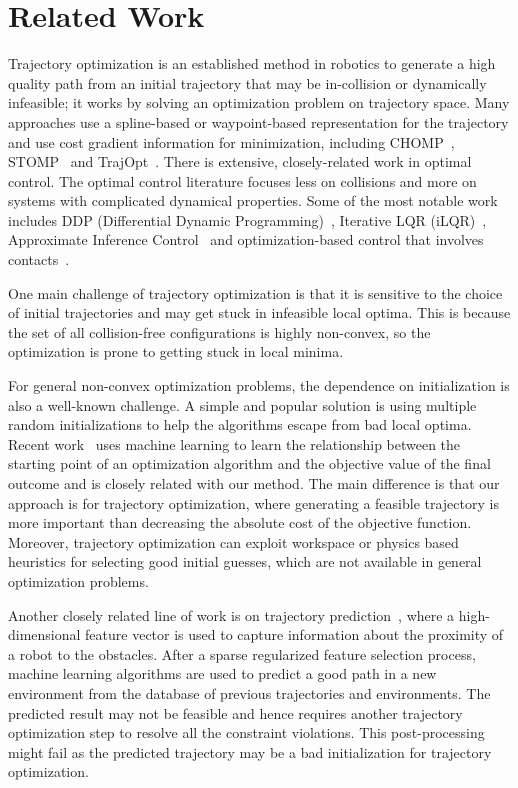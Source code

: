 \documentclass[letterpaper, 10 pt, conference]{ieeeconf}  %
\begin{document}
\section{Related Work}
\label{sec:related}
Trajectory optimization is an established method in robotics to generate a high quality path from an initial trajectory that may be in-collision or dynamically infeasible; it works by solving an optimization problem on trajectory space. Many approaches use a spline-based or waypoint-based representation for the trajectory and use cost gradient information for minimization, including CHOMP~\cite{Ratliff:2009:CGO}, STOMP~\cite{Kalakrishnan:2011:STOMP} and TrajOpt~\cite{Schulman:2013:FLO}. There is extensive, closely-related work in optimal control. The optimal control literature focuses less on collisions and more on systems with complicated dynamical properties. Some of the most notable work includes DDP (Differential Dynamic Programming)~\cite{Jacobson:1970:DDP,Atkeson:1994:ULT}, Iterative LQR (iLQR)~\cite{Todorvo:2005:iLQG}, Approximate Inference Control~\cite{Toussaint:2009:RTO} and optimization-based control that involves contacts~\cite{Mordatch:2012:DCB,Tassa:2012:SSC,Erez:2012:TOD,Posa:2013:DTO}. 

One main challenge of trajectory optimization is that it is sensitive to the choice of initial trajectories and may get stuck in infeasible local optima. This is because the set of all collision-free configurations is highly non-convex, so the optimization is prone to getting stuck in local minima.

For general non-convex optimization problems, the dependence on initialization is also a well-known challenge. A simple and popular solution is using multiple random initializations to help the algorithms escape from bad local optima. 
Recent work~\cite{Cassioli:2012:MLG} uses machine learning to learn the relationship between the starting point of an optimization algorithm and the objective value of the final outcome and is closely related with our method. The main difference is that our approach is for trajectory optimization, where generating a feasible trajectory is more important than decreasing the absolute cost of the objective function. Moreover, trajectory optimization can exploit workspace or physics based heuristics for selecting good initial guesses, which are not available in general optimization problems.

Another closely related line of work is on trajectory prediction~\cite{Jetchev:2013:FMP}, where a high-dimensional feature vector is used to capture information about the proximity of a robot to the obstacles. After a sparse regularized feature selection process, machine learning algorithms are used to predict a good path in a new environment from the database of previous trajectories and environments. The predicted result may not be feasible and hence requires another trajectory optimization step to resolve all the constraint violations. This post-processing might fail as the predicted trajectory may be a bad initialization for trajectory optimization.
\end{document}
